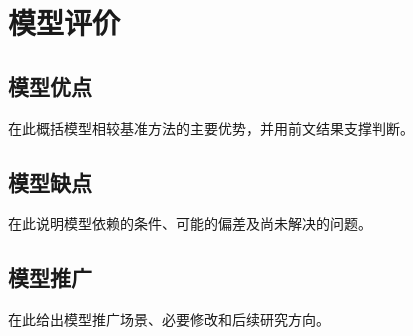 \section{模型评价}

\subsection{模型优点}
在此概括模型相较基准方法的主要优势，并用前文结果支撑判断。

\subsection{模型缺点}
在此说明模型依赖的条件、可能的偏差及尚未解决的问题。

\subsection{模型推广}
在此给出模型推广场景、必要修改和后续研究方向。

